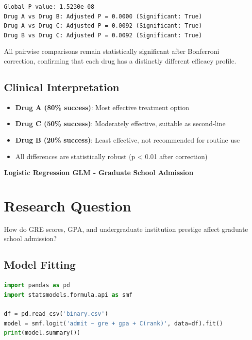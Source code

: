 \documentclass[12pt, a4paper]{article}
\newcounter{problemcounter}
\newcommand{\problemtitle}[1]{%
    \vspace{1cm}
    \begin{tcolorbox}[
        colback=DeepForest!5,
        colframe=DeepForest,
        arc=15pt,
        boxrule=1.2pt,
        left=20pt,
        right=20pt,
        top=12pt,
        bottom=12pt,
        enhanced,
        attach boxed title to top center={yshift=-8pt},
        boxed title style={
            colback=AmberSunset,
            colframe=DeepForest,
            arc=10pt,
            outer arc=10pt,
            boxrule=0.8pt,
            sharp corners,
            },
        title={\color{white}\large\sffamily\bfseries \faTasks \quad PROBLEM \arabic{problemcounter}}
    ]
        \centering
        {\color{DeepForest}\Large\bfseries\sffamily #1}
    \end{tcolorbox}
    \stepcounter{problemcounter}
    \vspace{0.3cm}
}
\begin{document}
\begin{outputbox}
\begin{verbatim}
Global P-value: 1.5230e-08
Drug A vs Drug B: Adjusted P = 0.0000 (Significant: True)
Drug A vs Drug C: Adjusted P = 0.0092 (Significant: True)
Drug B vs Drug C: Adjusted P = 0.0092 (Significant: True)
\end{verbatim}
\end{outputbox}

\begin{insightbox}
All pairwise comparisons remain statistically significant after Bonferroni correction, confirming that each drug has a distinctly different efficacy profile.
\end{insightbox}

\subsection*{Clinical Interpretation}

\begin{itemize}
    \item \textbf{Drug A (80\% success)}: Most effective treatment option
    \item \textbf{Drug C (50\% success)}: Moderately effective, suitable as second-line
    \item \textbf{Drug B (20\% success)}: Least effective, not recommended for routine use
    \item All differences are statistically robust (p < 0.01 after correction)
\end{itemize}

\newpage

\problemtitle{Logistic Regression GLM - Graduate School Admission}

\section*{Research Question}
How do GRE scores, GPA, and undergraduate institution prestige affect graduate school admission?

\subsection*{Model Fitting}

\begin{lstlisting}[language=Python]
import pandas as pd
import statsmodels.formula.api as smf

df = pd.read_csv('binary.csv')
model = smf.logit('admit ~ gre + gpa + C(rank)', data=df).fit()
print(model.summary())
\end{lstlisting}
\end{document}
